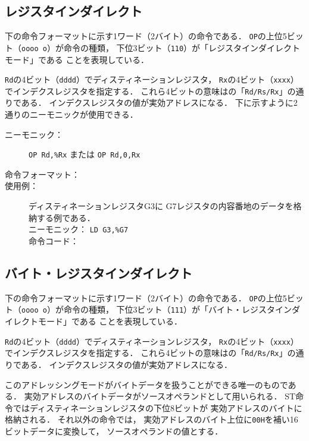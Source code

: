 \subsection{レジスタインダイレクト}
下の命令フォーマットに示す1ワード（2バイト）の命令である．
\texttt{OP}の上位5ビット（\texttt{oooo o}）が命令の種類，
下位3ビット（\texttt{110}）が「レジスタインダイレクトモード」である
ことを表現している．

\texttt{Rd}の4ビット（\texttt{dddd}）でディスティネーションレジスタ，
\texttt{Rx}の4ビット（\texttt{xxxx}）でインデクスレジスタを指定する．
これら4ビットの意味はの「\texttt{Rd/Rs/Rx}」の通りである．
インデクスレジスタの値が実効アドレスになる．
下に示すように2通りのニーモニックが使用できる．

\begin{description}
\item[ニーモニック：] \texttt{OP Rd,\%Rx} または \texttt{OP Rd,0,Rx}

\item[命令フォーマット：] %

\item[使用例：] ディスティネーションレジスタG3に
G7レジスタの内容番地のデータを格納する例である．\\
ニーモニック： \texttt{LD G3,\%G7}\\
命令コード：
\end{description}

\subsection{バイト・レジスタインダイレクト}
下の命令フォーマットに示す1ワード（2バイト）の命令である．
\texttt{OP}の上位5ビット（\texttt{oooo o}）が命令の種類，
下位3ビット（\texttt{111}）が「バイト・レジスタインダイレクトモード」である
ことを表現している．

\texttt{Rd}の4ビット（\texttt{dddd}）でディスティネーションレジスタ，
\texttt{Rx}の4ビット（\texttt{xxxx}）でインデクスレジスタを指定する．
これら4ビットの意味はの「\texttt{Rd/Rs/Rx}」の通りである．
インデクスレジスタの値が実効アドレスになる．

このアドレッシングモードがバイトデータを扱うことができる唯一のものである．
実効アドレスのバイトデータがソースオペランドとして用いられる．
ST命令ではディスティネーションレジスタの下位8ビットが
実効アドレスのバイトに格納される．
それ以外の命令では，
実効アドレスのバイト上位に\texttt{00H}を補い16ビットデータに変換して，
ソースオペランドの値とする．

